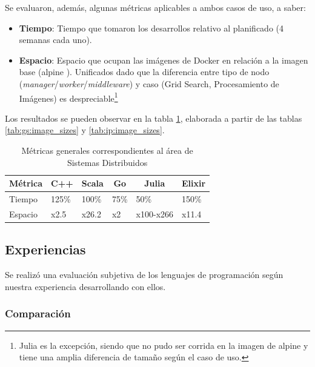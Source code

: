 \documentclass[11pt]{article}
\let\Oldsubsection\subsection
\renewcommand{\subsection}{\FloatBarrier\Oldsubsection}
\let\Oldsubsubsection\subsubsection
\renewcommand{\subsubsection}{\FloatBarrier\Oldsubsubsection}
\newcommand{\english}[1]{\textit{#1}}
\begin{document}
Se evaluaron, además, algunas métricas aplicables a ambos casos de uso, a saber:

\begin{itemize}
    \item \textbf{Tiempo}: Tiempo que tomaron los desarrollos relativo al planificado (4 semanas cada uno).
    \item \textbf{Espacio}: Espacio que ocupan las imágenes de Docker en relación a la imagen base (alpine \cite{metrics:apline}). Unificados dado que la diferencia entre tipo de nodo (\english{manager}/\english{worker}/\english{middleware}) y caso (Grid Search, Procesamiento de Imágenes) es despreciable\footnote{Julia es la excepción, siendo que no pudo ser corrida en la imagen de alpine y tiene una amplia diferencia de tamaño según el caso de uso.}
\end{itemize}

Los resultados se pueden observar en la tabla \ref{tab:sis_dist:general_metrics}, elaborada a partir de las tablas \ref{tab:gs:image_sizes} y \ref{tab:ip:image_sizes}.

\begin{table}
\centering
\begin{tabular}{|l|l|l|l|l|l|}
\hline
\multicolumn{1}{|c|}{Métrica} & \multicolumn{1}{c|}{C++} & \multicolumn{1}{c|}{Scala} & \multicolumn{1}{c|}{Go} & \multicolumn{1}{c|}{Julia} & \multicolumn{1}{c|}{Elixir} \\ \hline
Tiempo                        & 125\%                    & 100\%                      & 75\%                    & 50\%                       & 150\%                       \\ \hline
Espacio                       & x2.5                     & x26.2                      & x2                      & x100-x266                  & x11.4                       \\ \hline
\end{tabular}
\caption{Métricas generales correspondientes al área de Sistemas Distribuidos}
\label{tab:sis_dist:general_metrics}
\end{table}

\subsection{Experiencias}

Se realizó una evaluación subjetiva de los lenguajes de programación según nuestra experiencia desarrollando con ellos.

\subsubsection{Comparación} \label{sec:subjective_comparison}
\end{document}
